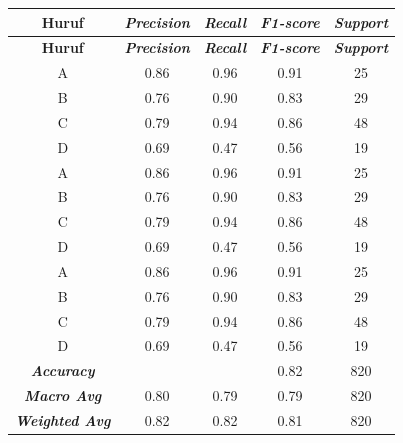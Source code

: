 {\footnotesize
\begin{longtable}{|c|c|c|c|c|}
\hline
\textbf{Huruf} & \textit{\textbf{Precision}} & \textit{\textbf{Recall}} & \textit{\textbf{F1-score}} & \textit{\textbf{Support}} \\
\hline
\endfirsthead
\hline
\textbf{Huruf} & \textit{\textbf{Precision}} & \textit{\textbf{Recall}} & \textit{\textbf{F1-score}} & \textit{\textbf{Support}} \\
\hline
\endhead
A & 0.86 & 0.96 & 0.91 & 25 \\\hline
B & 0.76 & 0.90 & 0.83 & 29 \\\hline
C & 0.79 & 0.94 & 0.86 & 48 \\\hline
D & 0.69 & 0.47 & 0.56 & 19 \\\hline
A & 0.86 & 0.96 & 0.91 & 25 \\\hline
B & 0.76 & 0.90 & 0.83 & 29 \\\hline
C & 0.79 & 0.94 & 0.86 & 48 \\\hline
D & 0.69 & 0.47 & 0.56 & 19 \\\hline
A & 0.86 & 0.96 & 0.91 & 25 \\\hline
B & 0.76 & 0.90 & 0.83 & 29 \\\hline
C & 0.79 & 0.94 & 0.86 & 48 \\\hline
D & 0.69 & 0.47 & 0.56 & 19 \\\hline
\textit{\textbf{Accuracy}} &  &  & 0.82 & 820 \\ \hline
\textit{\textbf{Macro Avg}} & 0.80 & 0.79 & 0.79 & 820 \\ \hline
\textit{\textbf{Weighted Avg}} & 0.82 & 0.82 & 0.81 & 820 \\
\hline
\end{longtable}
}


